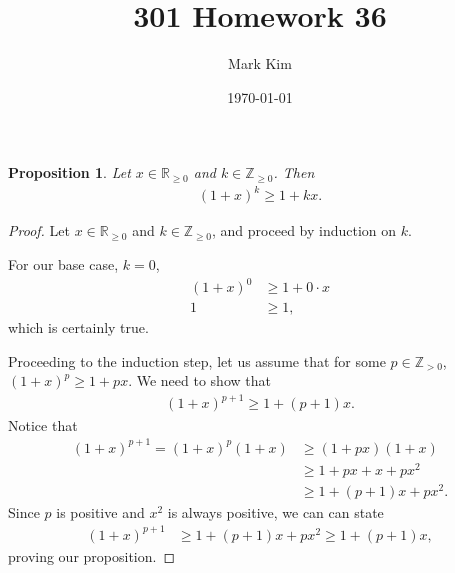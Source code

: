 \documentclass[12pt]{amsart}
\title{301 Homework 36}
\author{Mark Kim}
\date{\today}
\newcommand{\Z}{\mathbb{Z}}
\newcommand{\R}{\mathbb{R}}
\newtheorem*{proposition}{Proposition}
\begin{document}
\maketitle

\begin{proposition}
Let $x\in\R_{\geq 0}$ and $k\in\Z_{\geq 0}$.  Then
\begin{align*}
(1+x)^k \geq 1+kx.
\end{align*}
\end{proposition}

\begin{proof}
Let $x\in\R_{\geq 0}$ and $k\in\Z_{\geq 0}$, and proceed by induction on $k$.

For our base case, $k=0$,
\begin{align*}
(1+x)^0 &\geq 1 + 0\cdot x\\
1&\geq 1,
\end{align*}
which is certainly true.

Proceeding to the induction step, let us assume that for some $p\in\Z_{>0}$, $(1+x)^p \geq 1 +px$.  We need to show that
\begin{align*}
(1+x)^{p+1} \geq 1 + (p+1)x.
\end{align*}
Notice that
\begin{align*}
(1+x)^{p+1} = (1+x)^p (1+x) &\geq (1+px)(1+x)\\
&\geq 1+px+x+px^2\\
&\geq 1+(p+1)x +px^2.
\end{align*}
Since $p$ is positive and $x^2$ is always positive, we can can state
\begin{align*}
(1+x)^{p+1} &\geq 1+(p+1)x +px^2 \geq 1 + (p+1)x,
\end{align*}
proving our proposition.
\end{proof}
\end{document}
